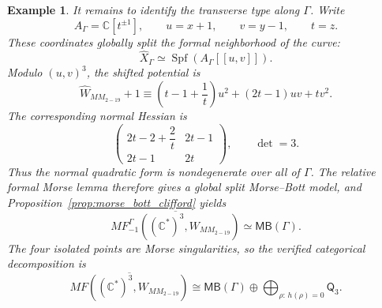\documentclass[11pt]{amsart}
\newtheorem{example}{Example}[section]
\newcommand{\MorseCat}[1]{\mathsf{Q}_{#1}}
\newcommand{\MBcat}[1]{\mathsf{MB}(#1)}
\begin{document}
\begin{example}
It remains to identify the transverse type along $\Gamma$. Write
\[
A_{\Gamma}=\mathbb C[t^{\pm1}],
\qquad
u=x+1,
\qquad
v=y-1,
\qquad
t=z.
\]
These coordinates globally split the formal neighborhood of the curve:
\[
\widehat X_{\Gamma}
\simeq
\operatorname{Spf}\!\left(A_{\Gamma}[[u,v]]\right).
\]
Modulo $(u,v)^3$, the shifted potential is
\[
\widehat W_{MM_{2-19}}+1
\equiv
\left(t-1+\frac1t\right)u^2+(2t-1)uv+tv^2.
\]
The corresponding normal Hessian is
\[
\begin{pmatrix}
2t-2+\dfrac{2}{t} & 2t-1\\
2t-1 & 2t
\end{pmatrix},
\qquad
\det=3.
\]
Thus the normal quadratic form is nondegenerate over all of $\Gamma$. The
relative formal Morse lemma therefore gives a global split Morse--Bott model,
and Proposition~\ref{prop:morse_bott_clifford} yields
\[
\overline{MF^{\Gamma}_{-1}((\mathbb C^*)^3,W_{MM_{2-19}})}
\simeq
\MBcat{\Gamma}.
\]
The four isolated points are Morse singularities, so the verified categorical
decomposition is
\[
\overline{MF((\mathbb{C}^*)^3,W_{MM_{2-19}})}
\cong \MBcat{\Gamma} \oplus \bigoplus_{\rho:\,h(\rho)=0}\MorseCat{3}.
\]
\end{example}
\end{document}

